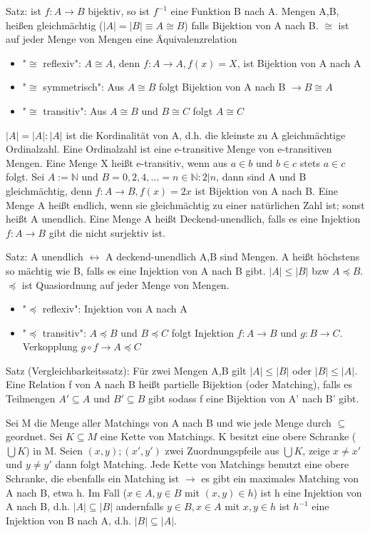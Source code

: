 \documentclass[10pt,landscape]{article}
\begin{document}
\begin{multicols}{3}
Satz: ist $f:A\rightarrow B$ bijektiv, so ist $f^{-1}$ eine Funktion B nach A. Mengen A,B, heißen gleichmächtig ($|A|=|B| \equiv A\cong B$) falls Bijektion von A nach B. $\cong$ ist auf jeder Menge von Mengen eine Äquivalenzrelation
\begin{itemize}
    \item "$\cong$ reflexiv": $A\cong A$, denn $f:A\rightarrow A, f(x)=X$, ist Bijektion von A nach A
    \item "$\cong$ symmetrisch": Aus $A\cong B$ folgt Bijektion von A nach B $\rightarrow B\cong A$
    \item "$\cong$ transitiv": Aus $A\cong B$ und $B\cong C$ folgt $A\cong C$
\end{itemize}

$|A|=|A|:|A|$ ist die Kordinalität von A, d.h. die kleinste zu A gleichmächtige Ordinalzahl. Eine Ordinalzahl ist eine e-transitive Menge von e-transitiven Mengen. Eine Menge X heißt e-transitiv, wenn aus $a\in b$ und $b\in c$ stets $a\in c$ folgt.
Sei $A:=\mathbb{N}$ und $B={0,2,4,...}={n\in \mathbb{N}: 2|n}$, dann sind A und B gleichmächtig, denn $f:A\rightarrow B, f(x)=2x$ ist Bijektion von A nach B.
Eine Menge A heißt endlich, wenn sie gleichmächtig zu einer natürlichen Zahl ist; sonst heißt A unendlich.
Eine Menge A heißt Deckend-unendlich, falls es eine Injektion $f:A\rightarrow B$ gibt die nicht surjektiv ist.

Satz: A unendlich $\leftrightarrow$ A deckend-unendlich
A,B sind Mengen. A heißt höchstens so mächtig wie B, falls es eine Injektion von A nach B gibt. $|A|\leq |B|$ bzw $A\preceq B$. $\preceq$ ist Quasiordnung auf jeder Menge von Mengen.
\begin{itemize}
    \item "$\preceq$ reflexiv": Injektion von A nach A
    \item "$\preceq$ transitiv": $A\preceq B$ und $B\preceq C$ folgt Injektion $f:A\rightarrow B$ und $g:B\rightarrow C$. Verkopplung $g \circ f \rightarrow A \preceq C$
\end{itemize}

Satz (Vergleichbarkeitssatz):
Für zwei Mengen A,B gilt $|A|\leq |B|$ oder $|B| \leq |A|$. Eine Relation f von A nach B heißt partielle Bijektion (oder Matching), falls es Teilmengen $A'\subseteq A$ und $B'\subseteq B$ gibt sodass f eine Bijektion von A' nach B' gibt.

Sei M die Menge aller Matchings von A nach B und wie jede Menge durch $\subseteq$ geordnet. Sei $K\subseteq M$ eine Kette von Matchings. K besitzt eine obere Schranke ($\bigcup K$) in M. Seien $(x,y);(x',y')$ zwei Zuordnungspfeile aus $\bigcup K$, zeige $x\not = x'$ und $y\not = y'$ dann folgt Matching.
Jede Kette von Matchings benutzt eine obere Schranke, die ebenfalls ein Matching ist $\rightarrow$ es gibt ein maximales Matching von A nach B, etwa h. Im Fall ($x\in A, y\in B$ mit $(x,y)\in h$) ist h eine Injektion von A nach B, d.h. $|A| \subseteq |B|$ andernfalls $y\in B, x\in A$ mit $x,y\in h$ ist $h^{-1}$ eine Injektion von B nach A, d.h. $|B| \subseteq |A|$.


\end{multicols}
\end{document}
